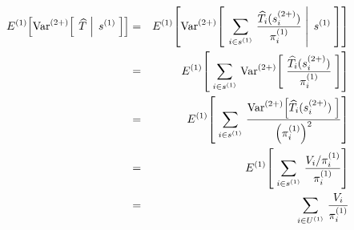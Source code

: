 \begin{eqnarray*}
E^{(1)}\!\left[\Var^{(2+)}\!\left[\;\left.\widehat{T}\;\right\vert\;s^{(1)}\;\right]\right]
&=&
E^{(1)}\!\left[\Var^{(2+)}\!\left[\;\left.
\sum_{i\in s^{(1)}}\,\frac{\widehat{T}_{i}(s^{(2+)}_{i})}{\pi^{(1)}_{i}}
\;\right\vert\;s^{(1)}\;\right]\right]
\\
&=&
E^{(1)}\!\left[\;\sum_{i\in s^{(1)}}\,
\Var^{(2+)}\!\left[\;\frac{\widehat{T}_{i}(s^{(2+)}_{i})}{\pi^{(1)}_{i}}\;\right]
\right]
\\
&=&
E^{(1)}\!\left[\;\sum_{i\in s^{(1)}}\,
\frac{\Var^{(2+)}\!\left[\widehat{T}_{i}(s^{(2+)}_{i})\;\right]}{\left(\pi^{(1)}_{i}\right)^{2}}
\right]
\\
&=&
E^{(1)}\!\left[\;\sum_{i\in s^{(1)}}\,
\frac{V_{i}/\pi^{(1)}_{i}}{\pi^{(1)}_{i}}
\right]
\\
&=&
\;\sum_{i\in U^{(1)}}\,\frac{V_{i}}{\pi^{(1)}_{i}}
\\
\end{eqnarray*}

